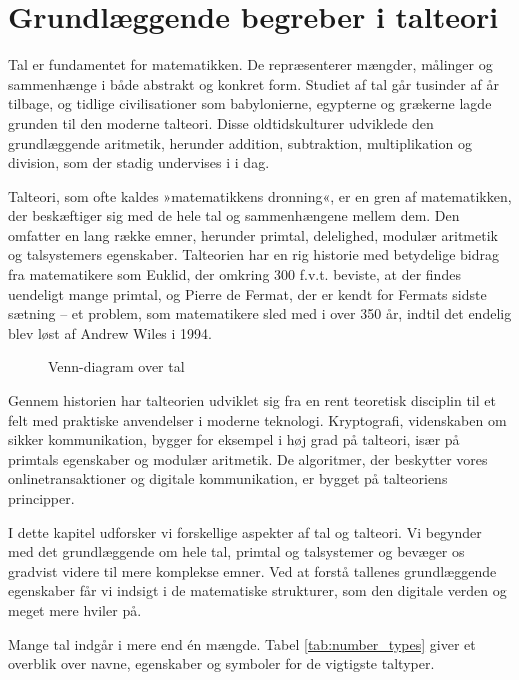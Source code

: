 \chapter{Grundlæggende begreber i talteori}
\label{chap:ch12}
Tal er fundamentet for matematikken. De repræsenterer mængder, målinger og sammenhænge i både abstrakt og konkret form. Studiet af tal går tusinder af år tilbage, og tidlige civilisationer som babylonierne, egypterne og grækerne lagde grunden til den moderne talteori. Disse oldtidskulturer udviklede den grundlæggende aritmetik, herunder addition, subtraktion, multiplikation og division, som der stadig undervises i i dag.

Talteori, som ofte kaldes »matematikkens dronning«, er en gren af matematikken, der beskæftiger sig med de hele tal og sammenhængene mellem dem. Den omfatter en lang række emner, herunder primtal, delelighed, modulær aritmetik og talsystemers egenskaber. Talteorien har en rig historie med betydelige bidrag fra matematikere som Euklid, der omkring 300 f.v.t. beviste, at der findes uendeligt mange primtal, og Pierre de Fermat, der er kendt for Fermats sidste sætning -- et problem, som matematikere sled med i over 350 år, indtil det endelig blev løst af Andrew Wiles i 1994.

\begin{figure}[h!]
    \centering
    
    \caption{Venn-diagram over tal}
    \label{fig:venn_num2}
\end{figure}

Gennem historien har talteorien udviklet sig fra en rent teoretisk disciplin til et felt med praktiske anvendelser i moderne teknologi. Kryptografi, videnskaben om sikker kommunikation, bygger for eksempel i høj grad på talteori, især på primtals egenskaber og modulær aritmetik. De algoritmer, der beskytter vores onlinetransaktioner og digitale kommunikation, er bygget på talteoriens principper.

I dette kapitel udforsker vi forskellige aspekter af tal og talteori. Vi begynder med det grundlæggende om hele tal, primtal og talsystemer og bevæger os gradvist videre til mere komplekse emner. Ved at forstå tallenes grundlæggende egenskaber får vi indsigt i de matematiske strukturer, som den digitale verden og meget mere hviler på.

\begin{remark}
Mange tal indgår i mere end én mængde. Tabel \ref{tab:number_types} giver et overblik over navne, egenskaber og symboler for de vigtigste taltyper.
\end{remark}

